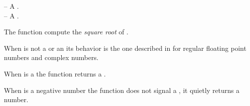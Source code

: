 \documentclass[../Comparisons-Predicates.tex]{subfiles}
\begin{document}

    \DSyntax{}

      \RArrow{} 

    \DArgsNValues{}

     -- A .\\
     -- A .

    \DDescription{}

    The function  compute the \emph{square root} of .

    \noindent
    When  is not a  or an
     its behavior is the one described in
    \cite{1996:ANSIHyperSpec} for regular floating point numbers and complex
    numbers.

    \noindent
    When  is a  the function 
    returns a
    .

    \noindent
    When  is a negative 
    number the function  does not signal a
    , it quietly returns a
     number.
\end{document}
